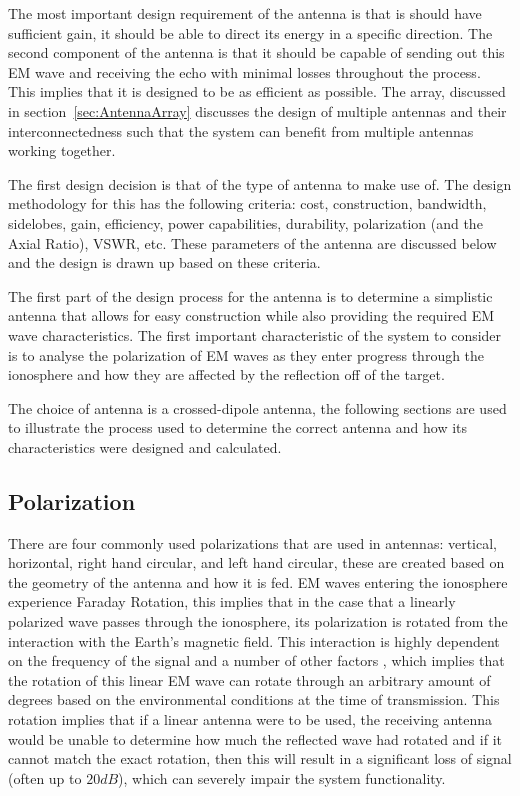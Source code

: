 \documentclass[11pt]{witseiepaper}
\begin{document}
The most important design requirement of the antenna is that is should have sufficient gain, it should be able to direct its energy in a specific direction. The second component of the antenna is that it should be capable of sending out this EM wave and receiving the echo with minimal losses throughout the process. This implies that it is designed to be as efficient as possible.
The array, discussed in section~\ref{sec:AntennaArray} discusses the design of multiple antennas and their interconnectedness such that the system can benefit from multiple antennas working together.

The first design decision is that of the type of antenna to make use of. The design methodology for this has the following criteria: cost, construction, bandwidth, sidelobes, gain, efficiency, power capabilities, durability, polarization (and the Axial Ratio), VSWR, etc. 
These parameters of the antenna are discussed below and the design is drawn up based on these criteria.

The first part of the design process for the antenna is to determine a simplistic antenna that allows for easy construction while also providing the required EM wave characteristics.
The first important characteristic of the system to consider is to analyse the polarization of EM waves as they enter progress through the ionosphere and how they are affected by the reflection off of the target.

The choice of antenna is a crossed-dipole antenna, the following sections are used to illustrate the process used to determine the correct antenna and how its characteristics were designed and calculated.

\subsection{Polarization} \label{sec:Polarization}
There are four commonly used polarizations that are used in antennas: vertical, horizontal, right hand circular, and left hand circular, these are created based on the geometry of the antenna and how it is fed.
EM waves entering the ionosphere experience Faraday Rotation, this implies that in the case that a linearly polarized wave passes through the ionosphere, its polarization is rotated from the interaction with the Earth's magnetic field. This interaction is highly dependent on the frequency of the signal and a number of other factors \cite[p.~24]{faradayRotationSlides}, which implies that the rotation of this linear EM wave can rotate through an arbitrary amount of degrees based on the environmental conditions at the time of transmission. This rotation implies that if a linear antenna were to be used, the receiving antenna would be unable to determine how much the reflected wave had rotated and if it cannot match the exact rotation, then this will result in a significant loss of signal (often up to $20 dB$), which can severely impair the system functionality.
\end{document}
